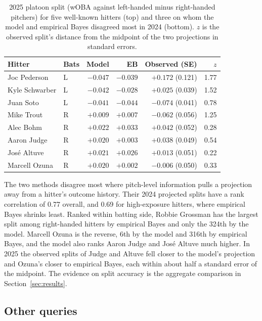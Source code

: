 \begin{table}[!ht]
\centering\small
\begin{tabular}{llrrrr}
\toprule
Hitter & Bats & Model & EB & Observed (SE) & $z$ \\
\midrule
Joc Pederson & L & $-0.047$ & $-0.039$ & $+0.172$ (0.121) & 1.77 \\
Kyle Schwarber & L & $-0.042$ & $-0.028$ & $+0.025$ (0.039) & 1.52 \\
Juan Soto & L & $-0.041$ & $-0.044$ & $-0.074$ (0.041) & 0.78 \\
Mike Trout & R & $+0.009$ & $+0.007$ & $-0.062$ (0.056) & 1.25 \\
Alec Bohm & R & $+0.022$ & $+0.033$ & $+0.042$ (0.052) & 0.28 \\
\midrule
Aaron Judge & R & $+0.020$ & $+0.003$ & $+0.038$ (0.049) & 0.54 \\
José Altuve & R & $+0.021$ & $+0.026$ & $+0.013$ (0.051) & 0.22 \\
Marcell Ozuna & R & $+0.020$ & $+0.002$ & $-0.006$ (0.050) & 0.33 \\
\bottomrule
\end{tabular}
\caption{2025 platoon split (wOBA against left-handed minus right-handed pitchers) for five well-known hitters (top) and three on whom the model and empirical Bayes disagreed most in 2024 (bottom). $z$ is the observed split's distance from the midpoint of the two projections in standard errors.}
\label{tab:cases}
\end{table}

The two methods disagree most where pitch-level information pulls a projection away from a hitter's outcome history. Their 2024 projected splits have a rank correlation of 0.77 overall, and 0.69 for high-exposure hitters, where empirical Bayes shrinks least. Ranked within batting side, Robbie Grossman has the largest split among right-handed hitters by empirical Bayes and only the 324th by the model. Marcell Ozuna is the reverse, 6th by the model and 316th by empirical Bayes, and the model also ranks Aaron Judge and José Altuve much higher. In 2025 the observed splits of Judge and Altuve fell closer to the model's projection and Ozuna's closer to empirical Bayes, each within about half a standard error of the midpoint. The evidence on split accuracy is the aggregate comparison in Section~\ref{sec:results}.

\subsection{Other queries}
\label{sec:otherqueries}

